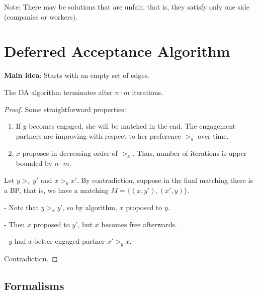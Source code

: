 Note: There may be solutions that are unfair, that is, they satisfy only one side (companies or workers).

\section{Deferred Acceptance Algorithm}

\textbf{Main idea}: Starts with an empty set of edges.

\begin{algorithmic}[1]
        \Else
            \EndIf
        \EndIf
    \EndWhile
\end{algorithmic}

\begin{theorem}
The DA algorithm terminates after $n \cdot m$ iterations.
\end{theorem}
\begin{proof}
Some straightforward properties:
\begin{enumerate}
\item If $y$ becomes engaged, she will be matched in the end. The engagement partners are improving with respect to her preference $>_y$ over time.
\item $x$ proposes in decreasing order of $>_x$.
Thus, number of iterations is upper bounded by $n \cdot m$.
\end{enumerate}

Let $y >_x y'$ and $x >_y x'$. By contradiction, suppose in the final matching there is a BP, that is, we have a matching $M=\{(x,y'), (x', y)\}$.

- Note that $y >_x y'$, so by algorithm, $x$ proposed to $y$.

- Then $x$ proposed to $y'$, but $x$ becomes free afterwards.

- $y$ had a better engaged partner $x' >_y x$.

Contradiction.
\end{proof}

\subsection{Formalisms}

